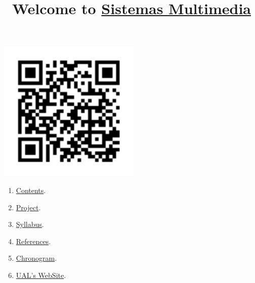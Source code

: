 
%
\title{Welcome to \href{https://www.ual.es/estudios/masteres/presentacion/plandeestudios/asignatura/7114/71142105}{Sistemas Multimedia}}

\maketitle

\begin{center}
  \includegraphics[width=256px]{SM_codigo_QR.png}
\end{center}

\begin{enumerate}
\item \href{https://sistemas-multimedia.github.io/contents}{Contents}.
\item \href{https://github.com/Sistemas-Multimedia/VCF}{Project}.
\item \href{https://sistemas-multimedia.github.io/syllabus}{Syllabus}.
\item \href{https://sistemas-multimedia.github.io/references}{References}.
\item \href{https://sistemas-multimedia.github.io/chronogram}{Chronogram}.
\item \href{https://www.ual.es/estudios/masteres/presentacion/plandeestudios/asignatura/7114/71142105}{UAL's WebSite}.
\end{enumerate}
